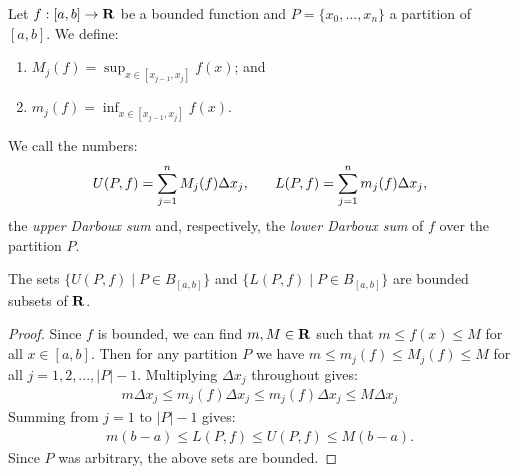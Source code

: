 \documentclass[11pt,twoside,openany]{memoir}
\begin{document}
    \begin{definition}
        Let $f:[a,b] \rightarrow \mathbf{R}$ be a bounded function and $P=\{x_0,...,x_n\}$ a partition of $[a,b]$. We define:
            \begin{enumerate}[label = (\arabic*),itemsep=1pt,topsep=3pt]
                \item $M_j(f) = \sup_{x \in [x_{j-1},x_j]}f(x)$; and
                \item $m_j(f) = \inf_{x \in [x_{j-1},x_j]}f(x)$.
            \end{enumerate}
        We call the numbers:
            \begin{equation*}
            \begin{split}
                U(P,f) = \sum_{j = 1}^n M_j(f)\Delta x_j, \h9\h9 L(P,f) = \sum_{j = 1}^n m_j(f)\Delta x_j, 
            \end{split}
            \end{equation*}
        the \textit{upper Darboux sum} and, respectively, the \textit{lower Darboux sum} of $f$ over the partition $P$.
    \end{definition}

    \iffalse
    Since $f$ is defined on all of $[a,b]$, it is not necessary that we define $M_j(f)$ strictly between the partition which it was defined. It is sufficient to consider the closed set $[x_{j-1},x_j]$.
    \fi

    \begin{proposition}
        The sets $\{U(P,f) \mid P \in B_{[a,b]}\}$ and $\{L(P,f) \mid P \in B_{[a,b]}\}$ are bounded subsets of $\mathbf{R}$.
    \end{proposition}
        \begin{proof}
            Since $f$ is bounded, we can find $m,M \in \mathbf{R}$ such that $m  \leq f(x) \leq M$ for all $x \in [a,b]$. Then for any partition $P$ we have $m \leq m_j(f) \leq M_j(f) \leq M$ for all $j = 1,2,...,|P|-1$. Multiplying $\Delta x_j$ throughout gives:
                \begin{equation*}
                \begin{split}
                    m \Delta x_j \leq  m_j(f)\Delta x_j \leq m_j(f)\Delta x_j \leq M\Delta x_j
                \end{split}
                \end{equation*}
            Summing from $j = 1$ to $|P|-1$ gives:
                \begin{equation*}
                \begin{split}
                    m (b-a) \leq  L(P,f) \leq U(P,f)\leq M(b-a).
                \end{split}
                \end{equation*}
            Since $P$ was arbitrary, the above sets are bounded.
        \end{proof}
\end{document}
